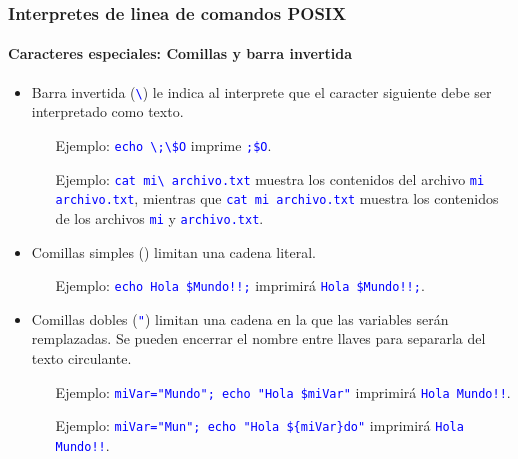 \documentclass[11pt,a4paper,spanish]{beamer}
\newcommand{\cw}[1]{\mbox{\texttt{\textcolor{blue}{#1}}}}
\newcommand{\dq}[0]{\Verb+"+}
\newcommand{\sq}[0]{\textquotesingle}
\begin{document}
\begin{frame}

    \frametitle{Interpretes de linea de comandos POSIX}
    \framesubtitle{Caracteres especiales: Comillas y barra invertida}

    \begin{itemize}
        \item Barra invertida (\cw{\textbackslash}) le indica al
            interprete que el caracter siguiente debe ser interpretado como
            texto.
        \begin{itemize}
            \item[Ejemplo:] \cw{echo
                \textbackslash{};\textbackslash{}\$O}
                imprime \cw{;\$O}.
            \item[Ejemplo:] \cw{cat mi\textbackslash{} archivo.txt}
                muestra los contenidos del archivo \cw{mi archivo.txt},
                mientras que \cw{cat mi archivo.txt} muestra los
                contenidos de los archivos \cw{mi} y
                \cw{archivo.txt}.\pause
        \end{itemize}
    \item Comillas simples (\cw{\sq{}}) limitan una cadena literal.
        \begin{itemize}
            \item[Ejemplo:] \cw{echo \sq{}Hola \$Mundo!!;\sq{}}
                imprimirá \cw{Hola \$Mundo!!;}.\pause
        \end{itemize}
    \item Comillas dobles (\cw{\dq{}}) limitan una cadena en la que las
        variables serán remplazadas. Se pueden encerrar el nombre entre llaves
            para separarla del texto circulante.
        \begin{itemize}
            \item[Ejemplo:] \cw{miVar=\dq{}Mundo\dq{}; echo \dq{}Hola
                \$miVar\dq{}} imprimirá \cw{Hola Mundo!!}.
            \item[Ejemplo:] \cw{miVar=\dq{}Mun\dq{}; echo \dq{}Hola
                \$\{miVar\}do\dq{}}
                imprimirá \cw{Hola Mundo!!}.
        \end{itemize}
    \end{itemize}

\end{frame}
\end{document}

